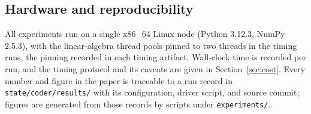 \subsection{Hardware and reproducibility}
\label{sec:repro}

All experiments run on a single x86_64 Linux node (Python 3.12.3, NumPy
2.5.3), with the linear-algebra thread pools pinned to two threads in the
timing runs, the pinning recorded in each timing artifact. Wall-clock time
is recorded per run, and the timing protocol and its caveats are given in
Section~\ref{sec:cost}.
Every number and figure in the paper is traceable to a run record in
\texttt{state/coder/results/} with its configuration, driver script, and
source commit; figures are generated from those records by scripts under
\texttt{experiments/}.

